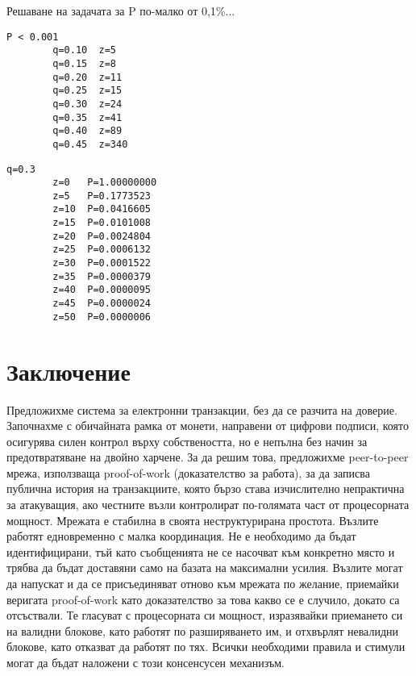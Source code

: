 \documentclass[11pt,a4paper]{article}
\begin{document}
Решаване на задачата за P по-малко от 0,1\%...
	
	\begin{lstlisting}[caption=Вероятност за успех на атака (P) при различни стойности на q и z, basicstyle=\ttfamily\footnotesize, frame=single]
		P < 0.001
		q=0.10  z=5
		q=0.15  z=8
		q=0.20  z=11
		q=0.25  z=15
		q=0.30  z=24
		q=0.35  z=41
		q=0.40  z=89
		q=0.45  z=340
	\end{lstlisting}
	
	\begin{lstlisting}[caption=Вероятност за успех на атака (P) при различни стойности на q и z (алтернативно представяне), basicstyle=\ttfamily\footnotesize, frame=single]
		q=0.3
		z=0   P=1.00000000
		z=5   P=0.1773523
		z=10  P=0.0416605
		z=15  P=0.0101008
		z=20  P=0.0024804
		z=25  P=0.0006132
		z=30  P=0.0001522
		z=35  P=0.0000379
		z=40  P=0.0000095
		z=45  P=0.0000024
		z=50  P=0.0000006
	\end{lstlisting}
	
\section{Заключение}
Предложихме система за електронни транзакции, без да се разчита на доверие. Започнахме с обичайната рамка от монети, направени от цифрови подписи, която осигурява силен контрол върху собствеността, но е непълна без начин за предотвратяване на двойно харчене. За да решим това, предложихме peer-to-peer мрежа, използваща proof-of-work (доказателство за работа), за да записва публична история на транзакциите, която бързо става изчислително непрактична за атакуващия, ако честните възли контролират по-голямата част от процесорната мощност. Мрежата е стабилна в своята неструктурирана простота. Възлите работят едновременно с малка координация. Не е необходимо да бъдат идентифицирани, тъй като съобщенията не се насочват към конкретно място и трябва да бъдат доставяни само на базата на максимални усилия. Възлите могат да напускат и да се присъединяват отново към мрежата по желание, приемайки веригата proof-of-work като доказателство за това какво се е случило, докато са отсъствали. Те гласуват с процесорната си мощност, изразявайки приемането си на валидни блокове, като работят по разширяването им, и отхвърлят невалидни блокове, като отказват да работят по тях. Всички необходими правила и стимули могат да бъдат наложени с този консенсусен механизъм.
\end{document}
